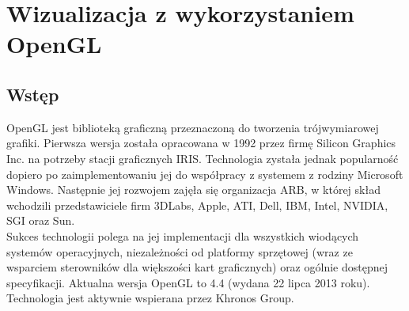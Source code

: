 \chapter{Wizualizacja z wykorzystaniem OpenGL}

\section{Wstęp}
OpenGL jest biblioteką graficzną przeznaczoną do tworzenia trójwymiarowej grafiki. Pierwsza wersja została opracowana w 1992 przez firmę Silicon Graphics Inc. na potrzeby stacji graficznych IRIS. Technologia zystała jednak popularność dopiero po zaimplementowaniu jej do współpracy z systemem z rodziny Microsoft Windows. Następnie jej rozwojem zajęła się organizacja ARB, w której skład wchodzili przedstawiciele firm 3DLabs, Apple, ATI, Dell, IBM, Intel, NVIDIA, SGI oraz Sun\cite{openGL}.\\ Sukces technologii polega na jej implementacji dla wszystkich wiodących systemów operacyjnych, niezależności od platformy sprzętowej (wraz ze wsparciem sterowników dla większości kart graficznych) oraz ogólnie dostępnej specyfikacji. Aktualna wersja OpenGL to 4.4 (wydana 22 lipca 2013 roku). Technologia jest aktywnie wspierana przez Khronos Group.

